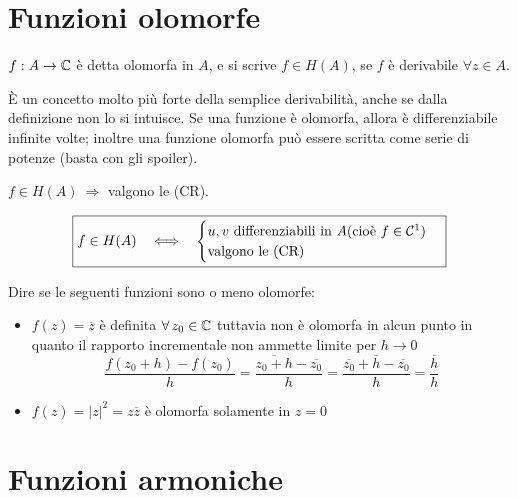 \section{Funzioni olomorfe}

\begin{defn}
$f:A\rightarrow\mathbb{C}$ è detta olomorfa in $A$, e si scrive $f\in H(A)$, se $f$ è derivabile $\forall z \in A$.
\end{defn}
È un concetto molto più forte della semplice derivabilità, anche se dalla definizione non lo si intuisce. Se una funzione è olomorfa, allora è differenziabile infinite volte; inoltre una funzione olomorfa può essere scritta come serie di potenze (basta con gli spoiler).

\begin{thm}
$f\in H(A)\ \Rightarrow$ valgono le (CR).
\end{thm}

\begin{thm}
\begin{equation*}
\boxed{f\in H(A) \ \ \iff \ \
\begin{cases}
u, v\ \text{differenziabili in} \ A (\text{cioè }f\in\mathcal{C}^1)\\
\text{valgono le (CR)}
\end{cases}}
\end{equation*}
\end{thm}

\begin{exa}
Dire se le seguenti funzioni sono o meno olomorfe:
\begin{itemize}
    \item $f(z)=\overline{z}$ è definita $\forall z_0\in\CC$ tuttavia non è olomorfa in alcun punto in quanto il rapporto incrementale non ammette limite per $h\to 0$
    \begin{equation*}
    \frac{f(z_0+h)-f(z_0)}{h}=\frac{\overline{z_0+h}-\overline{z_0}}{h}=\frac{\overline{z_0}+\overline{h}-\overline{z_0}}{h}=\frac{\overline{h}}{h}
    \end{equation*}
    \item $f(z)=|z|^2=z\overline{z}$ è olomorfa solamente in $z=0$
\end{itemize}
\end{exa}

\section{Funzioni armoniche}

